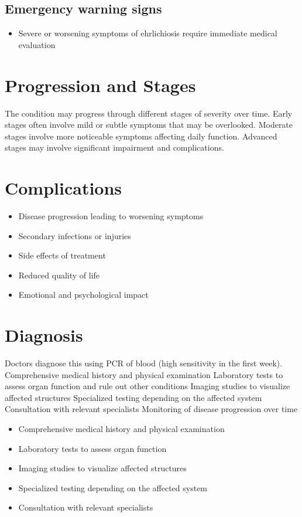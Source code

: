 \subsection{Emergency warning signs}
\begin{itemize}[noitemsep]
  \item Severe or worsening symptoms of ehrlichiosis require immediate medical evaluation
\end{itemize}
\section{Progression and Stages}
The condition may progress through different stages of severity over time. Early stages often involve mild or subtle symptoms that may be overlooked. Moderate stages involve more noticeable symptoms affecting daily function. Advanced stages may involve significant impairment and complications.
\section{Complications}
\begin{itemize}[noitemsep]
  \item Disease progression leading to worsening symptoms
  \item Secondary infections or injuries
  \item Side effects of treatment
  \item Reduced quality of life
  \item Emotional and psychological impact
\end{itemize}
\section{Diagnosis}
Doctors diagnose this using PCR of blood (high sensitivity in the first week). Comprehensive medical history and physical examination Laboratory tests to assess organ function and rule out other conditions Imaging studies to visualize affected structures Specialized testing depending on the affected system Consultation with relevant specialists Monitoring of disease progression over time

\begin{itemize}[noitemsep]
  \item Comprehensive medical history and physical examination
  \item Laboratory tests to assess organ function
  \item Imaging studies to visualize affected structures
  \item Specialized testing depending on the affected system
  \item Consultation with relevant specialists
\end{itemize}
